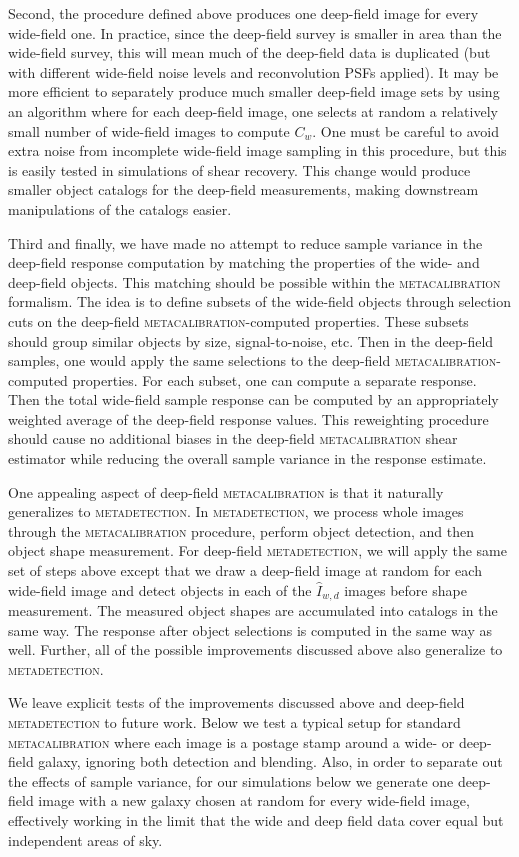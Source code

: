 \documentclass[twocolumn]{openjournal}
\makeatletter
\newcommand{\mdet}{\textsc{metadetection}\@\xspace}
\newcommand{\mcal}{\textsc{metacalibration}\@\xspace}
\makeatother
\begin{document}
Second, the procedure defined above produces one deep-field image for every wide-field
one. In practice, since the deep-field survey is smaller in area than the wide-field
survey, this will mean much of the deep-field data is duplicated (but with different
wide-field noise levels and reconvolution PSFs applied). It may be more efficient to
separately produce much smaller deep-field image sets by using an algorithm where for
each deep-field image, one selects at random a relatively small number of wide-field
images to compute $C_{w}$. One must be careful to avoid extra noise from incomplete
wide-field image sampling in this procedure, but this is easily tested in simulations of
shear recovery. This change would produce smaller object catalogs for the
deep-field measurements, making downstream manipulations of the catalogs easier.

Third and finally, we have made no attempt to reduce sample variance in the deep-field
response computation by matching the properties of the wide- and deep-field objects.
This matching should be possible within the \mcal formalism. The idea is to define
subsets of the wide-field objects through selection cuts on the deep-field
\mcal-computed properties. These subsets should group similar objects by size,
signal-to-noise, etc. Then in the deep-field samples, one would apply the same
selections to the deep-field \mcal-computed properties. For each subset, one can compute
a separate response. Then the total wide-field sample response can be computed by an
appropriately weighted average of the deep-field response values. This reweighting
procedure should cause no additional biases in the deep-field \mcal shear estimator
while reducing the overall sample variance in the response estimate.

One appealing aspect of deep-field \mcal is that it naturally generalizes to
\mdet. In \mdet, we process whole images through the \mcal procedure, perform object
detection, and then object shape measurement. For deep-field \mdet, we will apply the
same set of steps above except that we draw a deep-field image at random for each
wide-field image and detect objects in each of the $\hat I_{w,d}$ images before shape
measurement. The measured object shapes are accumulated into catalogs in the same way.
The response after object selections is computed in the same way as well. Further, all
of the possible improvements discussed above also generalize to \mdet.

We leave explicit tests of the improvements discussed above and deep-field \mdet to
future work. Below we test a typical setup for standard \mcal where each image is a
postage stamp around a wide- or deep-field galaxy, ignoring both detection and blending.
Also, in order to separate out the effects of sample variance, for our simulations below
we generate one deep-field image with a new galaxy chosen at random for every wide-field
image, effectively working in the limit that the wide and deep field data cover
equal but independent areas of sky.
\end{document}

